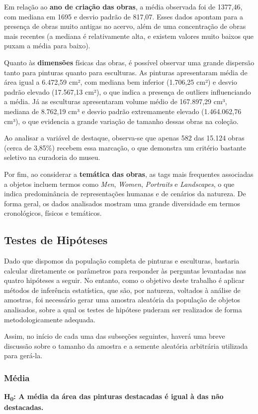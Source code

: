 \documentclass[11pt,a4paper]{article}
\begin{document}
Em relação ao \textbf{ano de criação das obras}, a média observada foi de 1377,46, com mediana em 1695 e desvio padrão de 817,07. Esses dados apontam para a presença de obras muito antigas no acervo, além de uma concentração de obras mais recentes (a mediana é relativamente alta, e existem valores muito baixos que puxam a média para baixo).

Quanto às \textbf{dimensões} físicas das obras, é possível observar uma grande dispersão tanto para pinturas quanto para esculturas. As pinturas apresentaram média de área igual a 6.472,59 cm², com mediana bem inferior (1.706,25 cm²) e desvio padrão elevado (17.567,13 cm²), o que indica a presença de outliers influenciando a média. Já as esculturas apresentaram volume médio de 167.897,29 cm³, mediana de 8.762,19 cm³ e desvio padrão extremamente elevado (1.464.062,76 cm³), o que evidencia a grande variação de tamanho dessas obras na coleção.

Ao analisar a variável de destaque, observa-se que apenas 582 das 15.124 obras (cerca de 3,85\%) recebem essa marcação, o que demonstra um critério bastante seletivo na curadoria do museu.

Por fim, ao considerar a \textbf{temática das obras}, as tags mais frequentes associadas a objetos incluem termos como \textit{Men}, \textit{Women}, \textit{Portraits} e \textit{Landscapes}, o que indica predominância de representações humanas e de cenários da natureza. De forma geral, os dados analisados mostram uma grande diversidade em termos cronológicos, físicos e temáticos.

\subsection{Testes de Hipóteses}
Dado que dispomos da população completa de pinturas e esculturas, bastaria calcular diretamente os parâmetros para responder às perguntas levantadas nas quatro hipóteses a seguir. No entanto, como o objetivo deste trabalho é aplicar métodos de inferência estatística, que são, por natureza, voltados à análise de amostras, foi necessário gerar uma amostra aleatória da população de objetos analisados, sobre a qual os testes de hipótese puderam ser realizados de forma metodologicamente adequada.

Assim, no início de cada uma das subseções seguintes, haverá uma breve discussão sobre o tamanho da amostra e a semente aleatória arbitrária utilizada para gerá-la.

\subsubsection{Média}
\textbf{H\textsubscript{0}: A média da área das pinturas destacadas é igual à das não destacadas.}
\end{document}
